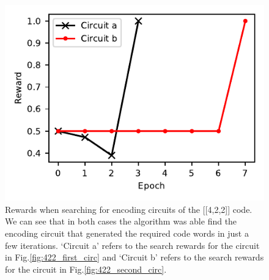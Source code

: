 \documentclass{ieeeaccess}
\begin{document}
\begin{figure}[H]
    \centering
    \includegraphics[width=0.8\linewidth]{peiyong_fig_5.pdf}
    \caption{Rewards when searching for encoding circuits of the [[4,2,2]] code. We can see that in both cases the algorithm was able find the encoding circuit that generated the required code words in just a few iterations. `Circuit a' refers to the search rewards for the circuit in Fig.\ref{fig:422_first_circ} and `Circuit b' refers to the search rewards for the circuit in Fig.\ref{fig:422_second_circ}.}\label{fig:422_reward}
\end{figure}
\end{document}
